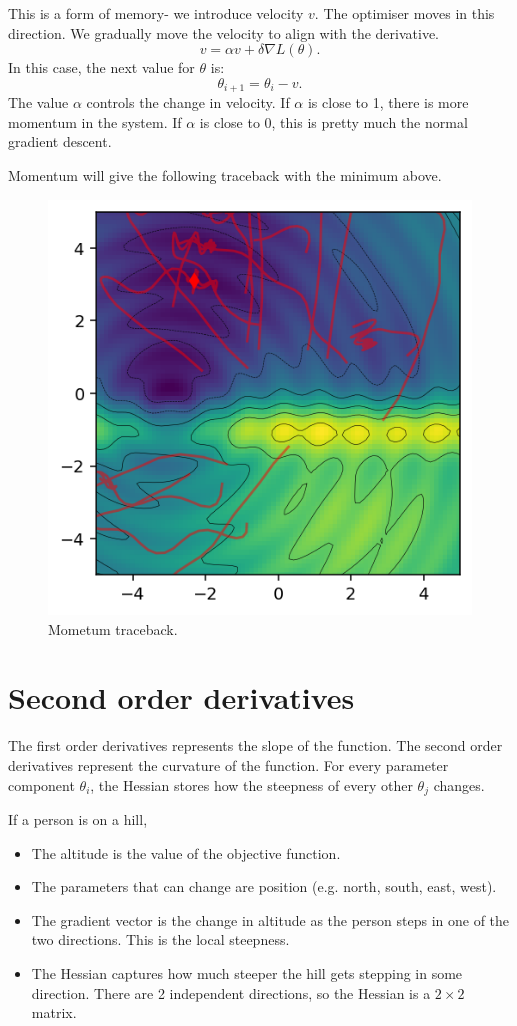 \documentclass[a4paper, openany]{memoir}
\begin{document}
This is a form of memory- we introduce velocity $v$. The optimiser moves in this direction. We gradually move the velocity to align with the derivative.
\[v = \alpha v + \delta \nabla L(\theta).\]
In this case, the next value for $\theta$ is:
\[\theta_{i+1} = \theta_i - v.\]
The value $\alpha$ controls the change in velocity. If $\alpha$ is close to 1, there is more momentum in the system. If $\alpha$ is close to 0, this is pretty much the normal gradient descent.

Momentum will give the following traceback with the minimum above.
\begin{figure}[H]
    \centering
    \includegraphics[scale=0.8]{src/4.33 random restart horrible function.png}
    \caption{Mometum traceback.}
\end{figure}

\section{Second order derivatives}
The first order derivatives represents the slope of the function. The second order derivatives represent the curvature of the function. For every parameter component $\theta_i$, the Hessian stores how the steepness of every other $\theta_j$ changes.

If a person is on a hill,
\begin{itemize}
    \item The altitude is the value of the objective function.
    \item The parameters that can change are position (e.g. north, south, east, west).
    \item The gradient vector is the change in altitude as the person steps in one of the two directions. This is the local steepness.
    \item The Hessian captures how much steeper the hill gets stepping in some direction. There are 2 independent directions, so the Hessian is a $2 \times 2$ matrix.
\end{itemize}
\end{document}
